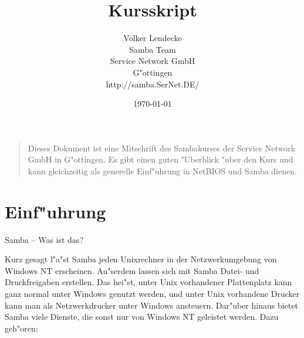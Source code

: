 \documentclass{scrartcl}
\begin{document}
\title{Kursskript\\[\baselineskip]
  }

\author{Volker Lendecke\\
Samba Team\\
Service Network GmbH\\
G"ottingen\\
http://samba.SerNet.DE/}

\date{\today}

\maketitle
\thispagestyle{empty}

\begin{quote}
  Dieses Dokument ist eine Mitschrift des Sambakurses der Service
  Network GmbH in G"ottingen. Es gibt einen guten "Uberblick "uber den
  Kurs und kann gleichzeitig als generelle Einf"uhrung in NetBIOS und
  Samba dienen.
\end{quote}

\break

\tableofcontents

\break

\section{Einf"uhrung}

Samba -- Was ist das?

Kurz gesagt l"a"st Samba jeden Unixrechner in der Netzwerkumgebung von
Windows NT erscheinen. Au"serdem lassen sich mit Samba Datei- und
Druckfreigaben erstellen. Das hei"st, unter Unix vorhandener
Plattenplatz kann ganz normal unter Windows genutzt werden, und unter
Unix vorhandene Drucker kann man als Netzwerkdrucker unter Windows
ansteuern. Dar"uber hinaus bietet Samba viele Dienste, die sonst nur
von Windows NT geleistet werden. Dazu geh"oren:
\end{document}
